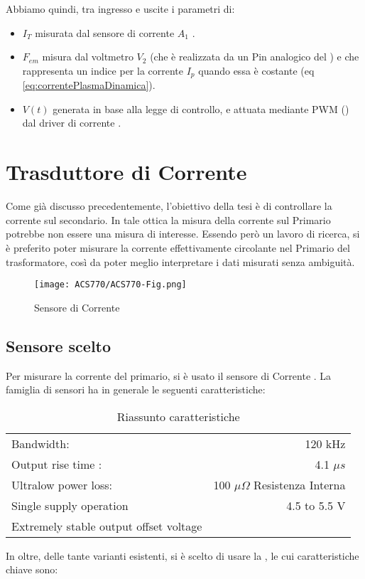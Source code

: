 Abbiamo quindi, tra ingresso e uscite i parametri di:
\begin{itemize}
	\item $I_T$ misurata dal sensore di corrente $ A_1 $ .
	\item $F_{em}$ misura dal voltmetro $V_2$ (che è realizzata da un Pin analogico del \microControllore) e che rappresenta un indice per  la corrente $I_p$ quando essa è costante (eq \ref{eq:correntePlasmaDinamica}).
	\item $V(t)$ generata in base alla legge di controllo, e attuata mediante PWM (\cite{modulazionePWM}) dal driver di corrente .
\end{itemize}


\newpage


\section{Trasduttore di Corrente}\label{CurrentSense}
Come già discusso precedentemente, l'obiettivo della tesi è di controllare la corrente sul secondario. In tale ottica la misura della corrente sul Primario potrebbe non essere una misura di interesse. Essendo però un lavoro di ricerca, si è preferito poter misurare la corrente effettivamente circolante nel Primario del trasformatore, così da poter meglio interpretare i dati misurati senza ambiguità.
\begin{figure}[H]
	\centering
	\caption[Sensore di Corrente ]{Sensore di Corrente}
	\texttt{[image: ACS770/ACS770-Fig.png]}
\end{figure}
\subsection{Sensore scelto}
Per misurare la corrente del primario, si è usato il sensore di Corrente \cite{ACS770}. La famiglia di sensori ha in generale le seguenti caratteristiche:
\begin{table}[H]
	\centering
	\label{tab:ACS770ParametriGenerali}
	\caption[\cite{ACS770}  Riassunto caratteristiche]{Riassunto caratteristiche}
	\begin{tabular}[t]{|l r|}
		\hline
		Bandwidth:                             & 120 kHz                               \\
		Output rise time :                     & 4.1 $ \mu s $                         \\
		Ultralow power loss:                   & 100 $ \mu \Omega $ Resistenza Interna \\
		Single supply operation                & 4.5 to 5.5 V                          \\
		Extremely stable output offset voltage &                                       \\
		\hline
	\end{tabular}
\end{table}
\noindent
In oltre, delle tante varianti esistenti, si è scelto di usare la , le cui caratteristiche chiave sono:

